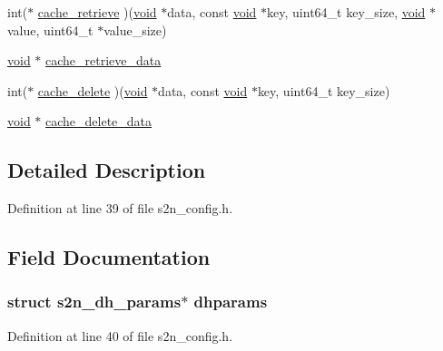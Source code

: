 \begin{DoxyCompactItemize}
int($\ast$ \hyperlink{structs2n__config_a3dd5ba99f3a9a867c2fea78d660b114a}{cache\+\_\+retrieve} )(\hyperlink{hw__4758__cca_8h_afad4d591c7931ff6dc5bf69c76c96aa0}{void} $\ast$data, const \hyperlink{hw__4758__cca_8h_afad4d591c7931ff6dc5bf69c76c96aa0}{void} $\ast$key, uint64\+\_\+t key\+\_\+size, \hyperlink{hw__4758__cca_8h_afad4d591c7931ff6dc5bf69c76c96aa0}{void} $\ast$value, uint64\+\_\+t $\ast$value\+\_\+size)
\item 
\hyperlink{hw__4758__cca_8h_afad4d591c7931ff6dc5bf69c76c96aa0}{void} $\ast$ \hyperlink{structs2n__config_a98a4dc336df5f8d09c3163968a61f6f2}{cache\+\_\+retrieve\+\_\+data}
\item 
int($\ast$ \hyperlink{structs2n__config_aee07b55c829f3dc3917616e17ae65c53}{cache\+\_\+delete} )(\hyperlink{hw__4758__cca_8h_afad4d591c7931ff6dc5bf69c76c96aa0}{void} $\ast$data, const \hyperlink{hw__4758__cca_8h_afad4d591c7931ff6dc5bf69c76c96aa0}{void} $\ast$key, uint64\+\_\+t key\+\_\+size)
\item 
\hyperlink{hw__4758__cca_8h_afad4d591c7931ff6dc5bf69c76c96aa0}{void} $\ast$ \hyperlink{structs2n__config_ac7bc331ca507124c1ef16e7d2321716b}{cache\+\_\+delete\+\_\+data}
\end{DoxyCompactItemize}


\subsection{Detailed Description}


Definition at line 39 of file s2n\+\_\+config.\+h.



\subsection{Field Documentation}
\subsubsection[{\texorpdfstring{dhparams}{dhparams}}]{\setlength{\rightskip}{0pt plus 5cm}struct {\bf s2n\+\_\+dh\+\_\+params}$\ast$ dhparams}\hypertarget{structs2n__config_abdbd12d9095df20e7e63ef00b353db7c}{}\label{structs2n__config_abdbd12d9095df20e7e63ef00b353db7c}


Definition at line 40 of file s2n\+\_\+config.\+h.

